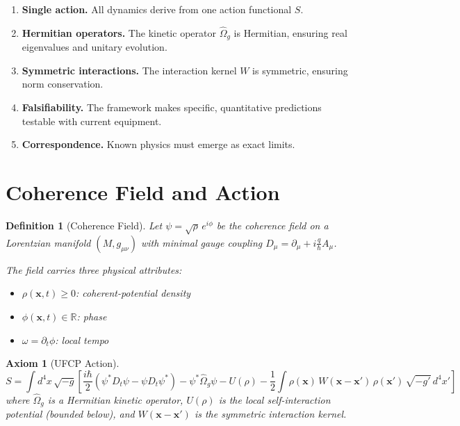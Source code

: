 \documentclass[11pt, a4paper]{article}
\newtheorem{definition}{Definition}[section]
\newtheorem{axiom}{Axiom}[section]
\begin{document}
\begin{enumerate}[label=\arabic*.]
  \item \textbf{Single action.} All dynamics derive from one action
        functional $S$.
  \item \textbf{Hermitian operators.} The kinetic operator
        $\hat{\Omega}_g$ is Hermitian, ensuring real eigenvalues and
        unitary evolution.
  \item \textbf{Symmetric interactions.} The interaction kernel $W$ is
        symmetric, ensuring norm conservation.
  \item \textbf{Falsifiability.} The framework makes specific,
        quantitative predictions testable with current equipment.
  \item \textbf{Correspondence.} Known physics must emerge as exact
        limits.
\end{enumerate}

\section{Coherence Field and Action}

\begin{definition}[Coherence Field]
Let $\psi = \sqrt{\rho}\, e^{i\phi}$ be the coherence field on a
Lorentzian manifold $(M, g_{\mu\nu})$ with minimal gauge coupling
$D_\mu = \partial_\mu + i\frac{q}{\hbar}A_\mu$.

The field carries three physical attributes:
\begin{itemize}[nosep]
  \item $\rho(\mathbf{x}, t) \geq 0$: coherent-potential density
  \item $\phi(\mathbf{x}, t) \in \mathbb{R}$: phase
  \item $\omega = \partial_t \phi$: local tempo
\end{itemize}
\end{definition}

\begin{axiom}[UFCP Action]
\begin{equation}
  \boxed{
  S = \int d^4x\, \sqrt{-g} \left[
    \frac{i\hbar}{2}\!\left(\psi^* D_t\psi - \psi D_t\psi^*\right)
    - \psi^* \hat{\Omega}_g \psi
    - U(\rho)
    - \frac{1}{2}\int \rho(\mathbf{x})\, W(\mathbf{x}-\mathbf{x}')\,
      \rho(\mathbf{x}')\, \sqrt{-g'}\, d^4x'
  \right]
  }
  \label{eq:action}
\end{equation}
where $\hat{\Omega}_g$ is a Hermitian kinetic operator, $U(\rho)$ is
the local self-interaction potential (bounded below), and
$W(\mathbf{x}-\mathbf{x}')$ is the symmetric interaction kernel.
\end{axiom}
\end{document}
